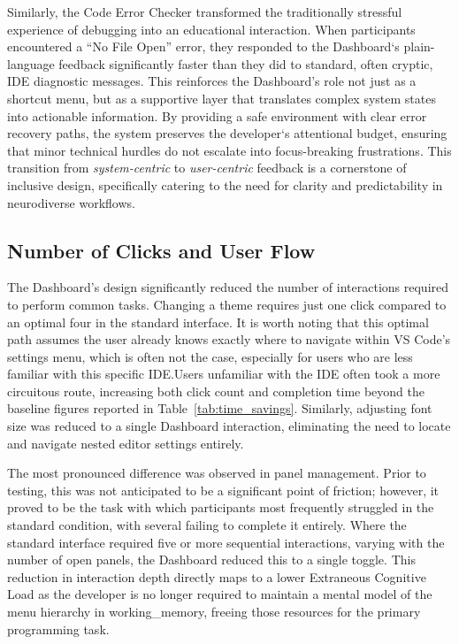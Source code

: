 Similarly, the Code Error Checker transformed the traditionally stressful experience of debugging into an educational interaction. When participants encountered a 
``No File Open'' error, they responded to the Dashboard`s plain-language feedback significantly faster than they did to standard, often cryptic, \gls{IDE} diagnostic messages.
 This reinforces the Dashboard's role not just as a shortcut menu, but as a supportive layer that translates complex system states into actionable information. 
 By providing a safe environment with clear error recovery paths, the system preserves the developer`s attentional budget, ensuring that minor 
 technical hurdles do not escalate into focus-breaking frustrations. This transition from \textit{system-centric} to \textit{user-centric} feedback is a cornerstone of inclusive 
 design, specifically catering to the need for clarity and predictability in \gls{neurodiverse} workflows.


\subsection{Number of Clicks and User Flow}
The Dashboard's design significantly reduced the number of interactions required to perform common tasks. Changing a theme requires just one click compared to an optimal four in the standard interface.
 It is worth noting that this optimal path assumes the user already knows exactly where to navigate within VS Code's settings menu, which is often not the case, especially for users who are less 
 familiar with this specific \gls{IDE}.Users unfamiliar with the \gls{IDE} often took a more circuitous route, increasing both click count and completion time beyond the baseline figures reported in Table~\ref{tab:time_savings}.
 Similarly, adjusting font size was reduced to a single Dashboard interaction, eliminating the need to locate and navigate nested editor settings entirely.

The most pronounced difference was observed in panel management. Prior to testing, this was not anticipated to be a significant point of friction; however, it proved to be the task with which participants
 most frequently struggled in the standard condition, with several failing to complete it entirely. Where the standard interface required five or more sequential interactions, varying with the number of open
panels, the Dashboard reduced this to a single toggle. This reduction in interaction depth directly maps to a lower Extraneous Cognitive Load as the developer is no longer required to maintain a mental model
 of the menu hierarchy in \gls{working_memory}, freeing those resources for the primary programming task.

